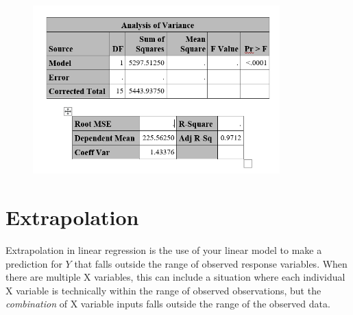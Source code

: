 \documentclass[12pt]{../notes}
\begin{document}
\newpage
{}

\begin{figure}[H]
\centering
\includegraphics[width=0.85\textwidth]{../figures/module2/anova_table_pre.png}
\end{figure}

\begin{minipage}[l][12cm][c]{\textwidth}

\end{minipage}

\section*{Extrapolation}
Extrapolation in linear regression is the use of your linear model to make a prediction for $Y$ that falls outside the range of observed response variables. When there are multiple X variables, this can include a situation where each individual X variable is technically within the range of observed observations, but the \textit{combination} of X variable inputs falls outside the range of the observed data. 
\end{document}
